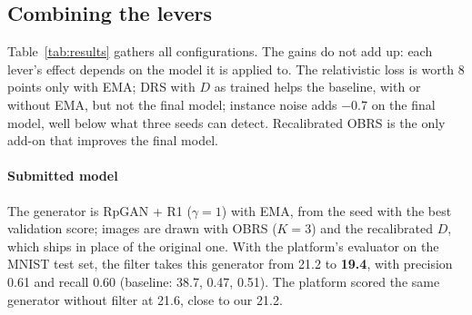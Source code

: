 \subsection{Combining the levers}
\label{sec:combination}
Table~\ref{tab:results} gathers all configurations. The gains do not add up: each lever's effect depends on the model it is applied to. The relativistic loss is worth 8 points only with EMA; DRS with $D$ as trained helps the baseline, with or without EMA, but not the final model; instance noise adds $-0.7$ on the final model, well below what three seeds can detect. Recalibrated OBRS is the only add-on that improves the final model.


\paragraph{Submitted model}
The generator is RpGAN + R1 ($\gamma=1$) with EMA, from the seed with the best validation score; images are drawn with OBRS ($K=3$) and the recalibrated $D$, which ships in place of the original one. With the platform's evaluator on the MNIST test set, the filter takes this generator from 21.2 to \textbf{19.4}, with precision 0.61 and recall 0.60 (baseline: 38.7, 0.47, 0.51). The platform scored the same generator without filter at 21.6, close to our 21.2.
